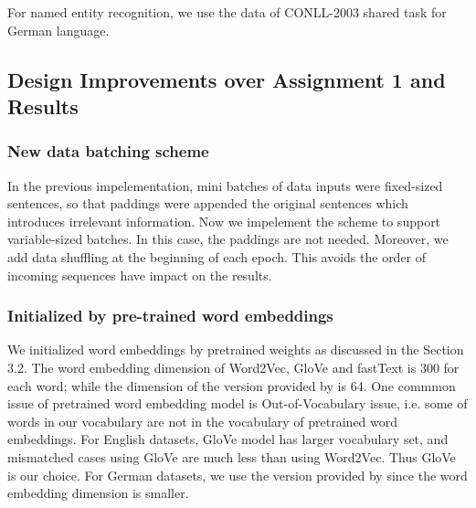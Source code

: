 \documentclass[11pt,a4paper]{article}
\begin{document}
For named entity recognition, we use the data of CONLL-2003 shared task \cite{tjongkimsang2003conll} for German language. 




\subsection{Design Improvements over Assignment 1 and Results}



\subsubsection{New data batching scheme}
In the previous impelementation, mini batches of data inputs were fixed-sized sentences, so that paddings were appended the original sentences which introduces irrelevant information. Now we impelement the scheme to support variable-sized batches. In this case, the paddings are not needed. Moreover, we add data shuffling at the beginning of each epoch. This avoids the order of incoming sequences have impact on the results.

\subsubsection{Initialized by pre-trained word embeddings}
We initialized word embeddings by pretrained weights as discussed in the Section 3.2. The word embedding dimension of Word2Vec, GloVe and fastText is 300 for each word; while the dimension of the version provided by \citet{goyal2018continuous} is 64. One commmon issue of pretrained word embedding model is Out-of-Vocabulary issue, i.e. some of words in our vocabulary are not in the vocabulary of pretrained word embeddings. For English datasets, GloVe model has larger vocabulary set, and mismatched cases using GloVe are much less than using Word2Vec. Thus GloVe is our choice. For German datasets, we use the version provided by \citet{goyal2018continuous} since the word embedding dimension is smaller.
\end{document}
